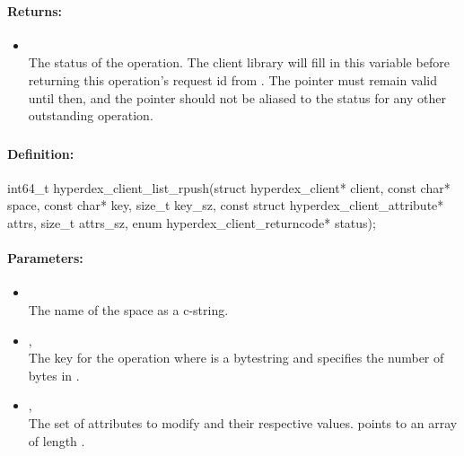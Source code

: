 \paragraph{Returns:}
\begin{itemize}[noitemsep]
\item {}\\
The status of the operation.  The client library will fill in this variable before returning this operation's request id from .  The pointer must remain valid until then, and the pointer should not be aliased to the status for any other outstanding operation.
\end{itemize}

\pagebreak
\subsubsection{}
\label{api:c:list_rpush}


\paragraph{Definition:}
\begin{ccode}
int64_t hyperdex_client_list_rpush(struct hyperdex_client* client,
        const char* space,
        const char* key, size_t key_sz,
        const struct hyperdex_client_attribute* attrs, size_t attrs_sz,
        enum hyperdex_client_returncode* status);
\end{ccode}

\paragraph{Parameters:}
\begin{itemize}[noitemsep]
\item {}\\
The name of the space as a c-string.
\item {}, \\
The key for the operation where  is a bytestring and  specifies the number of bytes in .
\item {}, \\
The set of attributes to modify and their respective values.   points to an array of length .
\end{itemize}

